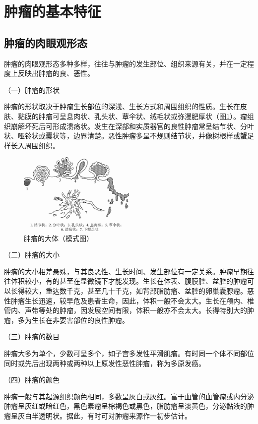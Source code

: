 \section{肿瘤的基本特征}

\subsection{肿瘤的肉眼观形态}

肿瘤的肉眼观形态多种多样，往往与肿瘤的发生部位、组织来源有关，并在一定程度上反映出肿瘤的良、恶性。

{（一）肿瘤的形状}

肿瘤的形状取决于肿瘤生长部位的深浅、生长方式和周围组织的性质。生长在皮肤、黏膜的肿瘤可呈息肉状、乳头状、蕈伞状、绒毛状或弥漫肥厚状（图\ref{fig5-1}）。瘤组织崩解坏死后可形成溃疡状。发生在深部和实质器官的良性肿瘤常呈结节状、分叶状、哑铃状或囊状等，边界清楚。恶性肿瘤多呈不规则结节状，并像树根样或蟹足样长入周围组织。

\begin{figure}[!htbp]
 \centering
 \includegraphics[width=0.5\textwidth]{./images/Image00068.jpg}
 \caption{肿瘤的大体（模式图）}
 \label{fig5-1}
  \end{figure}

{（二）肿瘤的大小}

肿瘤的大小相差悬殊，与其良恶性、生长时间、发生部位有一定关系。肿瘤早期往往体积较小，有的甚至在显微镜下才能发现。生长在体表、腹膜腔、盆腔的肿瘤可以长得较大，重达数千克，甚至几十千克，如背部脂肪瘤、盆腔的卵巢囊腺瘤。恶性肿瘤生长迅速，较早危及患者生命，因此，体积一般不会太大。生长在颅内、椎管内、声带等处的肿瘤，因发展空间有限，体积一般亦不会太大。长得特别大的肿瘤，多为生长在非要害部位的良性肿瘤。

{（三）肿瘤的数目}

肿瘤大多为单个，少数可呈多个，如子宫多发性平滑肌瘤。有时同一个体不同部位同时或先后出现两种或两种以上原发性恶性肿瘤，称为多原发癌。

{（四）肿瘤的颜色}

肿瘤一般与其起源组织颜色相同，多数呈灰白或灰红。富于血管的血管瘤或内分泌肿瘤呈灰红或暗红色，黑色素瘤呈棕褐色或黑色，脂肪瘤呈淡黄色，分泌黏液的肿瘤呈灰白半透明状。据此，有时可对肿瘤来源作一初步估计。

